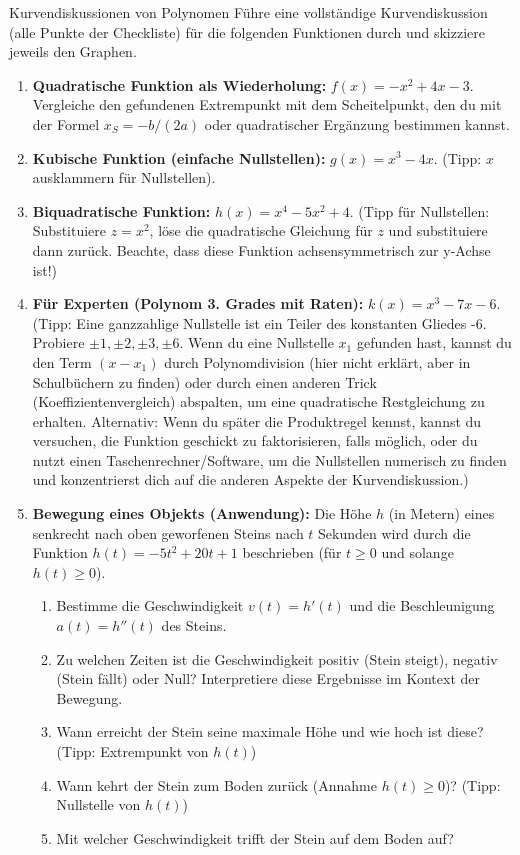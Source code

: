 \begin{aufgabenumgebung}{Kurvendiskussionen von Polynomen}
Führe eine vollständige Kurvendiskussion (alle Punkte der Checkliste) für die folgenden Funktionen durch und skizziere jeweils den Graphen.
\begin{enumerate}
    \item \textbf{Quadratische Funktion als Wiederholung:} $f(x) = -x^2 + 4x - 3$. Vergleiche den gefundenen Extrempunkt mit dem Scheitelpunkt, den du mit der Formel $x_S = -b/(2a)$ oder quadratischer Ergänzung bestimmen kannst.
    \item \textbf{Kubische Funktion (einfache Nullstellen):} $g(x) = x^3 - 4x$. (Tipp: $x$ ausklammern für Nullstellen).
    \item \textbf{Biquadratische Funktion:} $h(x) = x^4 - 5x^2 + 4$. (Tipp für Nullstellen: Substituiere $z=x^2$, löse die quadratische Gleichung für $z$ und substituiere dann zurück. Beachte, dass diese Funktion achsensymmetrisch zur y-Achse ist!)
    \item \textbf{Für Experten (Polynom 3. Grades mit Raten):} $k(x) = x^3 - 7x - 6$. (Tipp: Eine ganzzahlige Nullstelle ist ein Teiler des konstanten Gliedes -6. Probiere $\pm 1, \pm 2, \pm 3, \pm 6$. Wenn du eine Nullstelle $x_1$ gefunden hast, kannst du den Term $(x-x_1)$ durch Polynomdivision (hier nicht erklärt, aber in Schulbüchern zu finden) oder durch einen anderen Trick (Koeffizientenvergleich) abspalten, um eine quadratische Restgleichung zu erhalten. Alternativ: Wenn du später die Produktregel kennst, kannst du versuchen, die Funktion geschickt zu faktorisieren, falls möglich, oder du nutzt einen Taschenrechner/Software, um die Nullstellen numerisch zu finden und konzentrierst dich auf die anderen Aspekte der Kurvendiskussion.)
        \item \textbf{Bewegung eines Objekts (Anwendung):}
        Die Höhe $h$ (in Metern) eines senkrecht nach oben geworfenen Steins nach $t$ Sekunden wird durch die Funktion $h(t) = -5t^2 + 20t + 1$ beschrieben (für $t \ge 0$ und solange $h(t) \ge 0$).
        \begin{enumerate}
            \item Bestimme die Geschwindigkeit $v(t) = h'(t)$ und die Beschleunigung $a(t) = h''(t)$ des Steins.
            \item Zu welchen Zeiten ist die Geschwindigkeit positiv (Stein steigt), negativ (Stein fällt) oder Null? Interpretiere diese Ergebnisse im Kontext der Bewegung.
            \item Wann erreicht der Stein seine maximale Höhe und wie hoch ist diese? (Tipp: Extrempunkt von $h(t)$)
            \item Wann kehrt der Stein zum Boden zurück (Annahme $h(t) \ge 0$)? (Tipp: Nullstelle von $h(t)$)
            \item Mit welcher Geschwindigkeit trifft der Stein auf dem Boden auf?
        \end{enumerate}
\end{enumerate}
\end{aufgabenumgebung}


